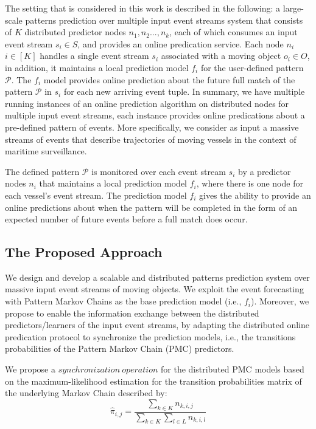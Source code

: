 \par The setting that is considered in this work is described in the following:
a large-scale patterns prediction over multiple input event streams system that  consists of $K$ distributed predictor nodes $n_1,n_2...,n_k$, each of which consumes an input event stream $s_i\in S$, and provides an online predication service. Each node $n_i$ $ i \in [K]$ handles a single event stream $s_i$ associated with a moving object $o_i \in O$, in addition,  it  maintains a local prediction model $f_i$ for the user-defined pattern $\mathcal{P}$. The $f_i$ model provides online prediction about the future full match of the pattern $\mathcal{P}$ in $s_i$  for each new arriving event tuple. In summary, we have multiple running instances of an online prediction algorithm on distributed nodes for multiple input event streams, each instance provides online predications about a pre-defined pattern of events. More specifically,  we consider as input a massive streams of events  that describe trajectories of moving vessels in the context of maritime surveillance.  

The defined pattern $\mathcal{P}$ is monitored over each event stream $s_i$  by a  predictor nodes  $n_i$  that maintains a local prediction model $f_i$, where there is one node for each vessel's event stream.  The prediction model $f_i$ gives the ability to provide an online predictions about when the pattern will be completed in the form of an expected number of future events before a full match does occur.

\subsection{The Proposed Approach}
\label{sec:proposed_approach}
\par We design and develop a scalable and distributed patterns prediction system over massive input event streams of moving objects. We  exploit the event forecasting with Pattern Markov Chains \cite{alevizos2017event} as the base prediction model (i.e., $f_i$). Moreover,  we propose to enable the information exchange between the distributed predictors/learners of the input event streams, by adapting the distributed online predication protocol \cite{kamp2014communication} to synchronize the prediction models, i.e., the transitions probabilities of the Pattern Markov Chain (PMC) predictors.

\par We propose a $synchronization\ operation$  for the distributed PMC models based on the maximum-likelihood estimation \citep{anderson1957statistical} for the transition probabilities matrix of the underlying Markov Chain described by: 
\begin{equation*}
\label{eq:dis_pi_estim}
\hat{\pi}_{i,j}=\frac{\sum_{k \in K} n_{k,i,j}}{\sum_{k \in K} \sum_{l \in L} n_{k,i,l}}
\end{equation*}


